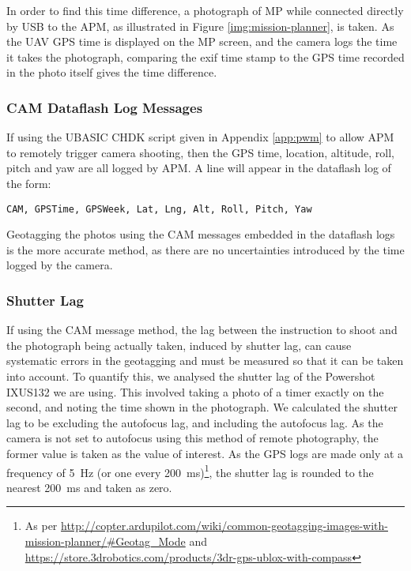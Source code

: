 In order to find this time difference, a photograph of MP while connected
directly by USB to the APM, as illustrated in Figure \ref{img:mission-planner},
is taken. As the UAV GPS time is displayed on the MP screen, and the camera logs
the time it takes the photograph, comparing the exif time stamp to the GPS time
recorded in the photo itself gives the time difference.

\subsubsection{CAM Dataflash Log Messages}

If using the UBASIC CHDK script given in Appendix \ref{app:pwm} to allow APM to
remotely trigger camera shooting, then the GPS time, location, altitude, roll,
pitch and yaw are all logged by APM. A line will appear in the dataflash log of
the form:

\begin{verbatim}
CAM, GPSTime, GPSWeek, Lat, Lng, Alt, Roll, Pitch, Yaw
\end{verbatim}

Geotagging the photos using the CAM messages embedded in the dataflash logs is
the more accurate method, as there are no uncertainties introduced by the time
logged by the camera.

\subsubsection{Shutter Lag}

If using the CAM message method, the lag between the instruction to shoot and
the photograph being actually taken, induced by shutter lag, can cause
systematic errors in the geotagging and must be measured so that it can be taken
into account. To quantify this, we analysed the shutter lag of the Powershot
IXUS132 we are using. This involved taking a photo of a
timer exactly on the second, and
noting the time shown in the photograph. We calculated the shutter lag to be
 excluding the autofocus lag, and 
including the autofocus lag. As the camera is not set to autofocus using this
method of remote photography, the former value is taken as the value of
interest. As the GPS logs are made only at a frequency of \SI{5}{Hz} (or one
every \SI{200}{ms})\footnote{As per
\url{http://copter.ardupilot.com/wiki/common-geotagging-images-with-mission-planner/\#Geotag_Mode}
and \url{https://store.3drobotics.com/products/3dr-gps-ublox-with-compass}}, the
shutter lag is rounded to the nearest \SI{200}{ms} and taken as zero.

